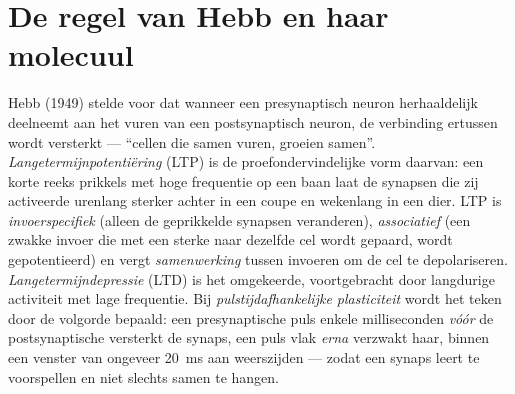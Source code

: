 \section{De regel van Hebb en haar molecuul}

\begin{definition}\label{def:b3:learning-memory:ltp}
Hebb (1949) stelde voor dat wanneer een presynaptisch neuron
herhaaldelijk deelneemt aan het vuren van een postsynaptisch neuron, de
verbinding ertussen wordt versterkt --- ``cellen die samen vuren,
groeien samen''. \emph{Langetermijnpotentiëring} (LTP) is de
proefondervindelijke vorm daarvan: een korte reeks prikkels met hoge
frequentie op een baan laat de synapsen die zij activeerde urenlang
sterker achter in een coupe en wekenlang in een dier. LTP is
\emph{invoerspecifiek} (alleen de geprikkelde synapsen veranderen),
\emph{associatief} (een zwakke invoer die met een sterke naar dezelfde
cel wordt gepaard, wordt gepotentieerd) en vergt \emph{samenwerking}
tussen invoeren om de cel te depolariseren.
\emph{Langetermijndepressie} (LTD) is het omgekeerde, voortgebracht
door langdurige activiteit met lage frequentie. Bij
\emph{pulstijdafhankelijke plasticiteit} wordt het teken door de
volgorde bepaald: een presynaptische puls enkele milliseconden
\emph{vóór} de postsynaptische versterkt de synaps, een puls vlak
\emph{erna} verzwakt haar, binnen een venster van ongeveer
\qty{20}{ms} aan weerszijden --- zodat een synaps leert te voorspellen
en niet slechts samen te hangen.
\end{definition}

